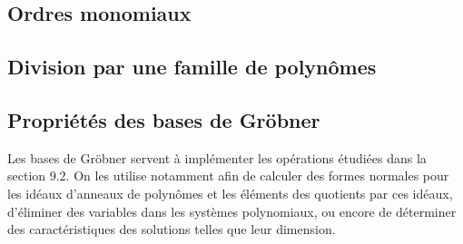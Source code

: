 \subsection{Ordres monomiaux}
\subsection{ Division par une famille de polynômes}
\subsection{ Propriétés des bases de Gröbner}
Les bases de Gröbner servent à implémenter les opérations étudiées dans la section 9.2. On les utilise notamment 
afin de calculer des formes normales pour les idéaux d’anneaux de polynômes et les éléments des quotients par 
ces idéaux, d’éliminer des variables dans les systèmes polynomiaux, ou encore de déterminer
des caractéristiques des solutions telles que leur dimension.
